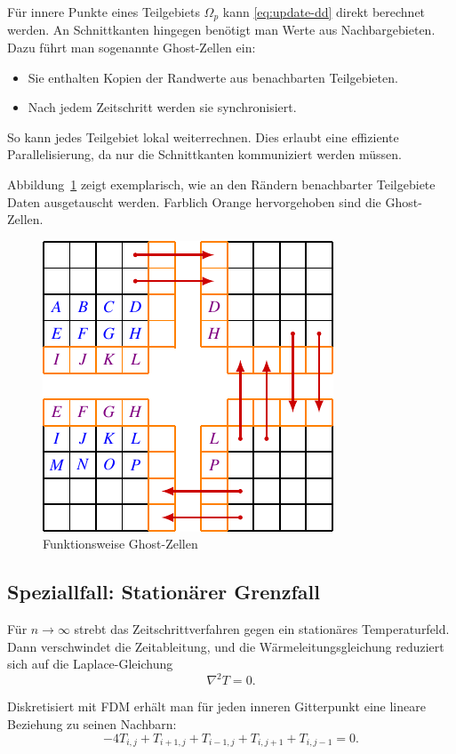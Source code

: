 Für innere Punkte eines Teilgebiets $\Omega_p$ kann \eqref{eq:update-dd} direkt berechnet werden.  
An Schnittkanten hingegen benötigt man Werte aus Nachbargebieten.  
Dazu führt man sogenannte Ghost-Zellen ein:
\begin{itemize}
	\item Sie enthalten Kopien der Randwerte aus benachbarten Teilgebieten.
	\item Nach jedem Zeitschritt werden sie synchronisiert.
\end{itemize}
So kann jedes Teilgebiet lokal weiterrechnen. Dies erlaubt eine effiziente Parallelisierung, da nur die Schnittkanten kommuniziert werden müssen.

Abbildung~\ref{parallelisierung:fig:ghostCells} zeigt exemplarisch, wie an den Rändern benachbarter Teilgebiete Daten ausgetauscht werden. Farblich Orange hervorgehoben sind die Ghost-Zellen.

\begin{figure}[htbp]
	\centering
	\includegraphics{papers/parallelisierung/images/ghostCells.pdf}
	\caption{Funktionsweise Ghost-Zellen}
	\label{parallelisierung:fig:ghostCells}
\end{figure}



\subsection{Speziallfall: Stationärer Grenzfall}
Für $n \to \infty$ strebt das Zeitschrittverfahren gegen ein stationäres Temperaturfeld. 
Dann verschwindet die Zeitableitung, und die Wärmeleitungsgleichung reduziert sich auf die Laplace-Gleichung
\[
\nabla^2 T = 0.
\]

Diskretisiert mit FDM erhält man für jeden inneren Gitterpunkt eine lineare Beziehung zu seinen Nachbarn:
\[
-4T_{i,j} + T_{i+1,j} + T_{i-1,j} + T_{i,j+1} + T_{i,j-1} = 0.
\]

